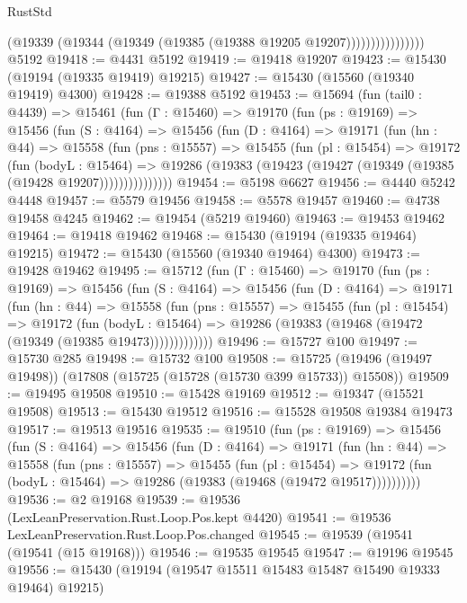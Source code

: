 \begin{lexlean}{RustStd}
\begin{coremodule}
                          (@19339 (@19344 (@19349 (@19385 (@19388 @19205 @19207))))))))))))))))
    @5192
@19418 := @4431 @5192
@19419 := @19418 @19207
@19423 := @15430 (@19194 (@19335 @19419) @19215)
@19427 := @15430 (@15560 (@19340 @19419) @4300)
@19428 := @19388 @5192
@19453 := @15694
    (fun (tail0 : @4439) =>
    @15461
      (fun (Γ : @15460) =>
      @19170
        (fun (ps : @19169) =>
        @15456
          (fun (S : @4164) =>
          @15456
            (fun (D : @4164) =>
            @19171
              (fun (hn : @44) =>
              @15558
                (fun (pns : @15557) =>
                @15455
                  (fun (pl : @15454) =>
                  @19172
                    (fun (bodyL : @15464) =>
                    @19286 (@19383 (@19423 (@19427 (@19349 (@19385 (@19428 @19207)))))))))))))))
@19454 := @5198 @6627
@19456 := @4440 @5242 @4448
@19457 := @5579 @19456
@19458 := @5578 @19457
@19460 := @4738 @19458 @4245
@19462 := @19454 (@5219 @19460)
@19463 := @19453 @19462
@19464 := @19418 @19462
@19468 := @15430 (@19194 (@19335 @19464) @19215)
@19472 := @15430 (@15560 (@19340 @19464) @4300)
@19473 := @19428 @19462
@19495 := @15712
    (fun (Γ : @15460) =>
    @19170
      (fun (ps : @19169) =>
      @15456
        (fun (S : @4164) =>
        @15456
          (fun (D : @4164) =>
          @19171
            (fun (hn : @44) =>
            @15558
              (fun (pns : @15557) =>
              @15455
                (fun (pl : @15454) =>
                @19172
                  (fun (bodyL : @15464) =>
                  @19286 (@19383 (@19468 (@19472 (@19349 (@19385 @19473)))))))))))))
@19496 := @15727 @100
@19497 := @15730 @285
@19498 := @15732 @100
@19508 := @15725 (@19496 (@19497 @19498)) (@17808 (@15725 (@15728 (@15730 @399 @15733)) @15508))
@19509 := @19495 @19508
@19510 := @15428 @19169
@19512 := @19347 (@15521 @19508)
@19513 := @15430 @19512
@19516 := @15528 @19508 @19384 @19473
@19517 := @19513 @19516
@19535 := @19510
    (fun (ps : @19169) =>
    @15456
      (fun (S : @4164) =>
      @15456
        (fun (D : @4164) =>
        @19171
          (fun (hn : @44) =>
          @15558
            (fun (pns : @15557) =>
            @15455
              (fun (pl : @15454) =>
              @19172 (fun (bodyL : @15464) => @19286 (@19383 (@19468 (@19472 @19517))))))))))
@19536 := @2 @19168
@19539 := @19536 (LexLeanPreservation.Rust.Loop.Pos.kept @4420)
@19541 := @19536 LexLeanPreservation.Rust.Loop.Pos.changed
@19545 := @19539 (@19541 (@19541 (@15 @19168)))
@19546 := @19535 @19545
@19547 := @19196 @19545
@19556 := @15430 (@19194 (@19547 @15511 @15483 @15487 @15490 @19333 @19464) @19215)

\end{coremodule}
\end{lexlean}
